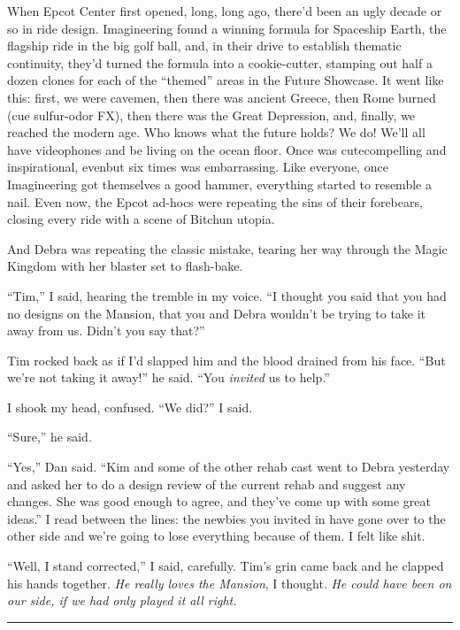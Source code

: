 When Epcot Center first opened, long, long ago, there'd been an
ugly decade or so in ride design. Imagineering found a winning
formula for Spaceship Earth, the flagship ride in the big golf
ball, and, in their drive to establish thematic continuity, they'd
turned the formula into a cookie-cutter, stamping out half a dozen
clones for each of the “themed” areas in the Future Showcase. It
went like this: first, we were cavemen, then there was ancient
Greece, then Rome burned (cue sulfur-odor FX), then there was the
Great Depression, and, finally, we reached the modern age. Who
knows what the future holds? We do! We'll all have videophones and
be living on the ocean floor. Once was cute{\dash}compelling and
inspirational, even{\dash}but six times was embarrassing. Like everyone,
once Imagineering got themselves a good hammer, everything started
to resemble a nail. Even now, the Epcot ad-hocs were repeating the
sins of their forebears, closing every ride with a scene of Bitchun
utopia.

And Debra was repeating the classic mistake, tearing her way
through the Magic Kingdom with her blaster set to flash-bake.

“Tim,” I said, hearing the tremble in my voice. “I thought you said
that you had no designs on the Mansion, that you and Debra wouldn't
be trying to take it away from us. Didn't you say that?”

Tim rocked back as if I'd slapped him and the blood drained from
his face. “But we're not taking it away!” he said. “You
\emph{invited} us to help.”

I shook my head, confused. “We did?” I said.

“Sure,” he said.

“Yes,” Dan said. “Kim and some of the other rehab cast went to
Debra yesterday and asked her to do a design review of the current
rehab and suggest any changes. She was good enough to agree, and
they've come up with some great ideas.” I read between the lines:
the newbies you invited in have gone over to the other side and
we're going to lose everything because of them. I felt like shit.

“Well, I stand corrected,” I said, carefully. Tim's grin came back
and he clapped his hands together.
\emph{He really loves the Mansion}, I thought.
\emph{He could have been on our side, if we had only played it all right.}

\begin{center}\rule{3in}{0.4pt}\end{center}

